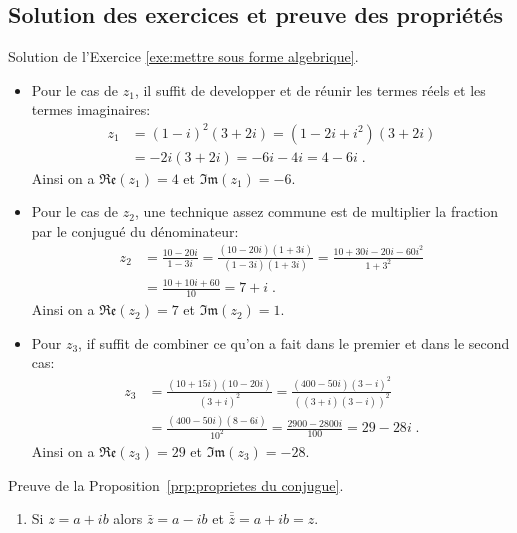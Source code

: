 \begin{corrige}

\section{Solution des exercices et preuve des propri\'et\'es}
\begin{sol}
Solution de l'Exercice \ref{exe:mettre sous forme algebrique}. 
\begin{itemize}
	\item Pour le cas de $z_1$, il suffit de developper et de r\'eunir les termes r\'eels et les termes imaginaires: 
		\begin{align*}
		      z_1 & = (1-i)^2 (3+2i) = (1-2i+i^2) (3+2i)  \\
		          & = -2i (3+2i) = -6i - 4i = 4 - 6i \;.
		\end{align*} 
		Ainsi on a $\mathfrak{Re}(z_1) = 4$ et $\mathfrak{Im}(z_1) = -6$.
	\item Pour le cas de $z_2$, une technique assez commune est de multiplier la fraction par le conjugu\'e du d\'enominateur: 
		\begin{align*}
		      z_2 & = \frac{10-20i}{1-3i} = \frac{(10 - 20 i) (1 + 3i)}{(1-3i) (1+3i)} 
		            = \frac{10 + 30i - 20i - 60 i^2}{1 + 3^2} \\
		          & = \frac{10 + 10 i + 60}{10} = 7 + i \;.
		\end{align*}
		Ainsi on a $\mathfrak{Re}(z_2) = 7$ et $\mathfrak{Im}(z_2) = 1$.
	\item Pour $z_3$, if suffit de combiner ce qu'on a fait dans le premier et dans le second cas:
		\begin{align*}
		      z_3 & = \frac{(10+15i)(10-20i)}{(3+i)^2} = \frac{(400-50i)(3-i)^2}{((3+i)(3-i))^2} \\
		          & = \frac{(400-50i)(8-6i)}{10^2} = \frac{2900 - 2800 i}{100} 
		            = 29 - 28 i \; . 
		\end{align*}
		Ainsi on a $\mathfrak{Re}(z_3) = 29$ et $\mathfrak{Im}(z_3) = -28$.
\end{itemize}
\label{sol:mettre sous forme algebrique}
\end{sol}
\begin{dem}
      \label{dem:proprietes du conjugue}
      Preuve de la Proposition~\ref{prp:proprietes du conjugue}. 
      \begin{enumerate}
            \item Si $z = a + i b$ alors $\bar{z} = a - i b$ et $\bar{\bar{z}} = a + i b = z$.

\end{enumerate}
\end{dem}
\end{corrige}
